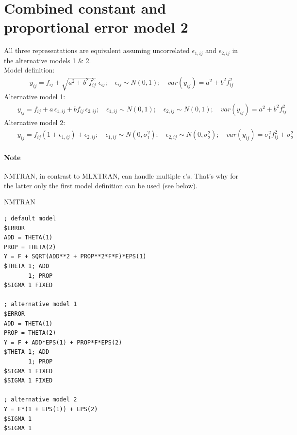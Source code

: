 \section{Combined constant and proportional error model 2}
\label{model5}
All three representations are equivalent assuming uncorrelated $\epsilon_{1,ij}$ 
and $\epsilon_{2,ij}$ in the alternative models 1 \& 2.\\
\bigskip
Model definition:
\begin{eqnarray}
&& y_{ij} =  f_{ij} + \sqrt{a^2 + b^2f_{ij}^2} \; \epsilon_{ij}; \quad \epsilon_{ij} \sim N(0,1); \quad \mathit{var}(y_{ij}) = a^2 + b^2f_{ij}^2 \nonumber
\end{eqnarray}
Alternative model 1:
\begin{eqnarray}
&& y_{ij} =  f_{ij} +  a\, \epsilon_{1,ij} + b f_{ij}\, \epsilon_{2,ij}; \quad \epsilon_{1,ij} \sim N(0,1); \quad \epsilon_{2,ij} \sim N(0,1);  \quad   \mathit{var}(y_{ij}) = a^2 + b^2f_{ij}^2 \nonumber
\end{eqnarray}
Alternative model 2:
\begin{eqnarray}
&& y_{ij} =  f_{ij} (1 + \epsilon_{1,ij}) + \epsilon_{2,ij}; \quad \epsilon_{1,ij} \sim N(0,\sigma_1^2); \quad \epsilon_{2,ij} \sim N(0,\sigma_2^2); \quad \mathit{var}(y_{ij}) = \sigma_1^2 f_{ij}^2 + \sigma_2^2 \nonumber
\end{eqnarray}

\paragraph{Note} NMTRAN, in contrast to MLXTRAN, can handle multiple $\epsilon$'s. 
That's why for the latter only the first model definition can be used (see below).

\bigskip
\begin{lrbox}{\lstbox}\begin{minipage}{16cm}
NMTRAN
\begin{lstlisting}[frame=single,language=NM]
; default model
$ERROR
ADD = THETA(1)
PROP = THETA(2)
Y = F + SQRT(ADD**2 + PROP**2*F*F)*EPS(1)
$THETA 1; ADD
	   1; PROP
$SIGMA 1 FIXED

; alternative model 1
$ERROR
ADD = THETA(1)
PROP = THETA(2)
Y = F + ADD*EPS(1) + PROP*F*EPS(2)
$THETA 1; ADD
	   1; PROP
$SIGMA 1 FIXED
$SIGMA 1 FIXED

; alternative model 2
Y = F*(1 + EPS(1)) + EPS(2)
$SIGMA 1
$SIGMA 1
\end{lstlisting}   
\end{minipage}\end{lrbox}
\usebox\lstbox


